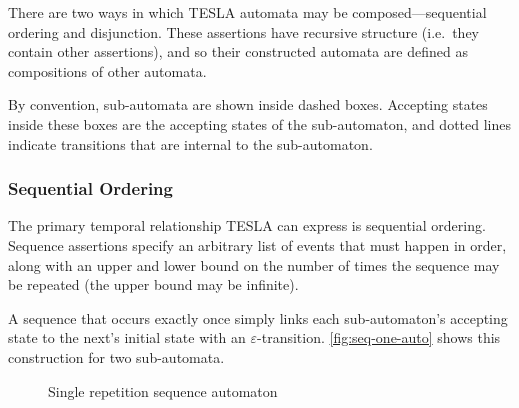 There are two ways in which TESLA automata may be composed---sequential
ordering and disjunction. These assertions have recursive structure
(i.e.\ they contain other assertions), and so their constructed automata
are defined as compositions of other automata.

By convention, sub-automata are shown inside dashed boxes. Accepting states
inside these boxes are the accepting states of the sub-automaton, and dotted
lines indicate transitions that are internal to the sub-automaton.

\subsubsection{Sequential Ordering}

The primary temporal relationship TESLA can express is sequential
ordering. Sequence assertions specify an arbitrary list of events that
must happen in order, along with an upper and lower bound on the number
of times the sequence may be repeated (the upper bound may be infinite).

A sequence that occurs exactly once simply links each sub-automaton's
accepting state to the next's initial state with an
$\varepsilon$-transition.  \autoref{fig:seq-one-auto} shows this
construction for two sub-automata.

\begin{figure}
  \centering
  \caption{Single repetition sequence automaton}
  \label{fig:seq-one-auto}
\end{figure}

